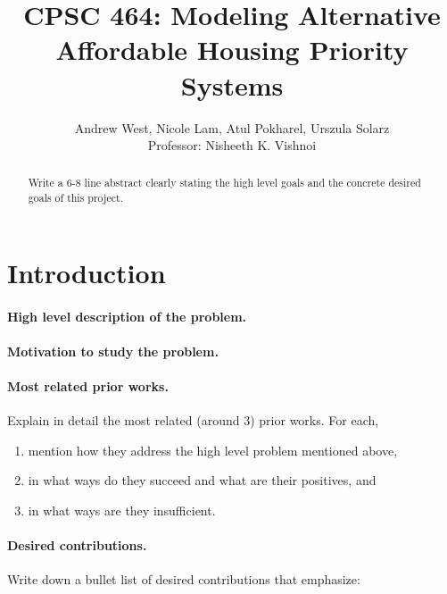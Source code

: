 \documentclass[11pt]{article}
\title{\bf CPSC 464: Modeling Alternative Affordable Housing Priority Systems}
\author{Andrew West, Nicole Lam, Atul Pokharel, Urszula Solarz \\
Professor: Nisheeth K. Vishnoi
}
\begin{document}
\maketitle
 
\begin{abstract}

Write a 6-8 line abstract clearly stating the high level goals and the concrete desired goals of this project. 
  
\end{abstract}


\newpage



\tableofcontents

\newpage

\section{Introduction}

\paragraph{High level description of the problem.}

\paragraph{Motivation to study the problem.}

\paragraph{Most related prior works.}
Explain in detail the most related (around 3) prior works. For each, 

\begin{enumerate}
\item  mention how they address the high level problem mentioned above,

\item in what ways do they succeed and what are their positives, and

\item in what ways are they insufficient.

\end{enumerate}


\paragraph{Desired contributions.}
Write down a bullet list of desired contributions that emphasize:
\end{document}
